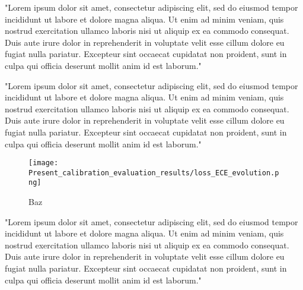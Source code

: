 "Lorem ipsum dolor sit amet, consectetur adipiscing elit, sed do eiusmod tempor incididunt ut labore et dolore magna aliqua. Ut enim ad minim veniam, quis nostrud exercitation ullamco laboris nisi ut aliquip ex ea commodo consequat. Duis aute irure dolor in reprehenderit in voluptate velit esse cillum dolore eu fugiat nulla pariatur. Excepteur sint occaecat cupidatat non proident, sunt in culpa qui officia deserunt mollit anim id est laborum."

%

"Lorem ipsum dolor sit amet, consectetur adipiscing elit, sed do eiusmod tempor incididunt ut labore et dolore magna aliqua. Ut enim ad minim veniam, quis nostrud exercitation ullamco laboris nisi ut aliquip ex ea commodo consequat. Duis aute irure dolor in reprehenderit in voluptate velit esse cillum dolore eu fugiat nulla pariatur. Excepteur sint occaecat cupidatat non proident, sunt in culpa qui officia deserunt mollit anim id est laborum."

\begin{figure}[htbp!]
  \centering
  \texttt{[image: Present\_calibration\_evaluation\_results/loss\_ECE\_evolution.png]}
  \caption[Baz]{Baz}
  \label{fig:loss_ECE_evolution}
\end{figure}
\newpage

"Lorem ipsum dolor sit amet, consectetur adipiscing elit, sed do eiusmod tempor incididunt ut labore et dolore magna aliqua. Ut enim ad minim veniam, quis nostrud exercitation ullamco laboris nisi ut aliquip ex ea commodo consequat. Duis aute irure dolor in reprehenderit in voluptate velit esse cillum dolore eu fugiat nulla pariatur. Excepteur sint occaecat cupidatat non proident, sunt in culpa qui officia deserunt mollit anim id est laborum."